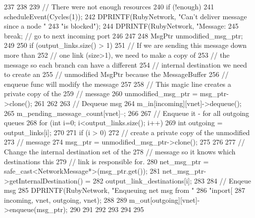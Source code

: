 \begin{DoxyCode}
{{{{{{237                     }
238 
239                     // There were not enough resources
240                     if (!enough) {
241                         scheduleEvent(Cycles(1));
242                         DPRINTF(RubyNetwork, "Can't deliver message since a node 
      "
243                                 "is blocked\n");
244                         DPRINTF(RubyNetwork, "Message: %
245                         break; // go to next incoming port
246                     }
247 
248                     MsgPtr unmodified_msg_ptr;
249 
250                     if (output_links.size() > 1) {
251                         // If we are sending this message down more than
252                         // one link (size>1), we need to make a copy of
253                         // the message so each branch can have a different
254                         // internal destination we need to create an
255                         // unmodified MsgPtr because the MessageBuffer
256                         // enqueue func will modify the message
257 
258                         // This magic line creates a private copy of the
259                         // message
260                         unmodified_msg_ptr = msg_ptr->clone();
261                     }
262 
263                     // Dequeue msg
264                     m_in[incoming][vnet]->dequeue();
265                     m_pending_message_count[vnet]--;
266 
267                     // Enqueue it - for all outgoing queues
268                     for (int i=0; i<output_links.size(); i++) {
269                         int outgoing = output_links[i];
270 
271                         if (i > 0) {
272                             // create a private copy of the unmodified
273                             // message
274                             msg_ptr = unmodified_msg_ptr->clone();
275                         }
276 
277                         // Change the internal destination set of the
278                         // message so it knows which destinations this
279                         // link is responsible for.
280                         net_msg_ptr = safe_cast<NetworkMessage*>(msg_ptr.get());
281                         net_msg_ptr->getInternalDestination() =
282                             output_link_destinations[i];
283 
284                         // Enqeue msg
285                         DPRINTF(RubyNetwork, "Enqueuing net msg from "
286                                 "inport[%
287                                 incoming, vnet, outgoing, vnet);
288 
289                         m_out[outgoing][vnet]->enqueue(msg_ptr);
290                     }
291                 }
292             }
293         }
294     }
295 }
\end{DoxyCode}


